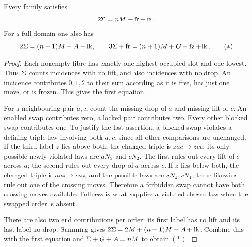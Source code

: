 \begin{lemma}\label{lem:moves}
Every family satisfies
\[
 2\Sigma=nM-\operatorname{fr}+\operatorname{fz}.
\]
For a full domain one also has
\[
 2\Sigma=(n+1)M-A+\operatorname{lk},
 \qquad
 3\Sigma+\operatorname{fr}=(n+1)M+G+\operatorname{fz}+\operatorname{lk}.             \tag{\(*\)}
\]
\end{lemma}
\begin{proof}
Each nonempty fibre has exactly one highest occupied slot and one
lowest. Thus \(\Sigma\) counts incidences with no lift, and also
incidences with no drop. An incidence contributes \(0,1,2\) to their
sum according as it is free, has just one move, or is frozen. This
gives the first equation.

For a neighbouring pair \(a,c\), count the missing drop of \(a\)
and missing lift of \(c\). An enabled swap contributes zero, a locked
pair contributes two. Every other blocked swap contributes one.
To justify the last assertion, a blocked swap violates a defining
triple law involving both \(a,c\), since all other comparisons are
unchanged. If the third label \(z\) lies above both, the changed triple
is \(zac\to zca\); its only possible newly violated laws are
\(aN_3\) and \(cN_2\). The first rules out every lift of \(c\)
across \(a\); the second rules out every drop of \(a\) across \(c\).
If \(z\) lies below both, the changed triple is \(acz\to caz\),
and the possible laws are \(aN_2,cN_1\); these likewise rule out one
of the crossing moves. Therefore a forbidden swap cannot have both
crossing moves available. Fullness is what supplies a violated
chosen law when the swapped order is absent.

There are also two end contributions per order: its first label has
no lift and its last label no drop. Summing gives
\(2\Sigma=2M+(n-1)M-A+\operatorname{lk}\). Combine this with the first equation
and \(\Sigma+G+A=nM\) to obtain \((*)\).
\end{proof}

